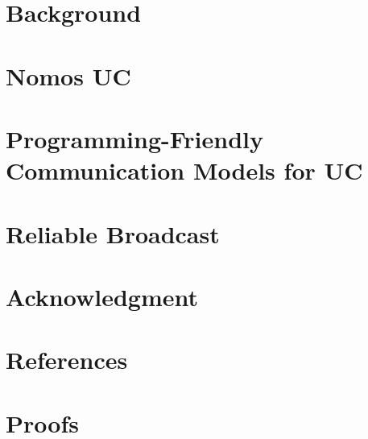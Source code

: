\documentclass[conference]{IEEEtran}
\begin{document}
\section{Background} \label{sec:background}


\section{Nomos UC}


%

\section{Programming-Friendly Communication Models for UC} \label{sec:wrappers}


\section{Reliable Broadcast} \label{sec:rbc}


\section*{Acknowledgment}

\section*{References}



\appendix

\section{Proofs}


%

\pagebreak

\begin{figure}

\end{figure}

%
\end{document}
